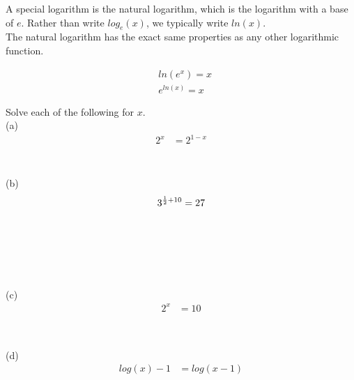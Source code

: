 A special logarithm is the natural logarithm, which is the logarithm with a base of $ e $. Rather than write $ log_e(x) $, we typically write $ ln(x) $. \\

The natural logarithm has the exact same properties as any other logarithmic function. \\

\begin{theorem}
	\begin{align}
		 & ln(e^x) = x   \\
		 & e^{ln(x)} = x
	\end{align}
\end{theorem}

\begin{exercise}\nonumber
	Solve each of the following for $ x $. \\

	(a)
	\begin{align}
		2^x & = 2^{1-x}     \\
		\\
		\\
		\\
	\end{align}
	\\

	(b)
	\begin{align}
		3^{{1 \over 2} + 10} & = 27   \\
		\\
		\\
		\\
		\\
	\end{align}
	\\

	(c)
	\begin{align}
		2^x     & = 10                   \\
		\\
		\\
		\\
		\\
	\end{align}
	\\

	(d)
	\begin{align}
		log(x) - 1   & = log(x - 1)                           \\
		\\
		\\
		\\
		\\
		\\
		\\
		\\
	\end{align}
	\\


\end{exercise}
